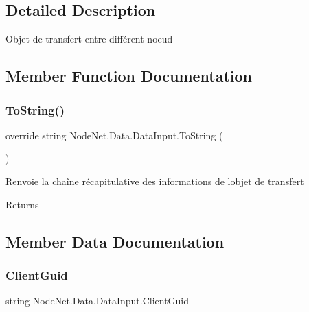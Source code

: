 \subsection{Detailed Description}
Objet de transfert entre différent noeud 



\subsection{Member Function Documentation}
\mbox{\label{class_node_net_1_1_data_1_1_data_input_aa23bde4ee4b72c84387aab337088e847}} 
\subsubsection{\texorpdfstring{To\+String()}{ToString()}}
{\footnotesize\ttfamily override string Node\+Net.\+Data.\+Data\+Input.\+To\+String (\begin{DoxyParamCaption}{ }\end{DoxyParamCaption})}



Renvoie la chaîne récapitulative des informations de l\textquotesingle{}objet de transfert 

\begin{DoxyReturn}{Returns}

\end{DoxyReturn}


\subsection{Member Data Documentation}
\mbox{\label{class_node_net_1_1_data_1_1_data_input_aca3453553072236a2d8bc48f31adef86}} 
\subsubsection{\texorpdfstring{Client\+Guid}{ClientGuid}}
{\footnotesize\ttfamily string Node\+Net.\+Data.\+Data\+Input.\+Client\+Guid}



